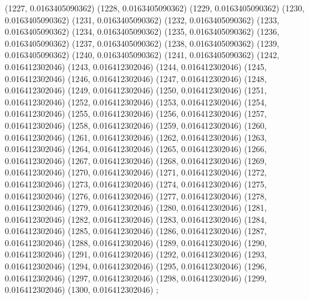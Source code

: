 {					(1227, 0.0163405090362)
					(1228, 0.0163405090362)
					(1229, 0.0163405090362)
					(1230, 0.0163405090362)
					(1231, 0.0163405090362)
					(1232, 0.0163405090362)
					(1233, 0.0163405090362)
					(1234, 0.0163405090362)
					(1235, 0.0163405090362)
					(1236, 0.0163405090362)
					(1237, 0.0163405090362)
					(1238, 0.0163405090362)
					(1239, 0.0163405090362)
					(1240, 0.0163405090362)
					(1241, 0.0163405090362)
					(1242, 0.016412302046)
					(1243, 0.016412302046)
					(1244, 0.016412302046)
					(1245, 0.016412302046)
					(1246, 0.016412302046)
					(1247, 0.016412302046)
					(1248, 0.016412302046)
					(1249, 0.016412302046)
					(1250, 0.016412302046)
					(1251, 0.016412302046)
					(1252, 0.016412302046)
					(1253, 0.016412302046)
					(1254, 0.016412302046)
					(1255, 0.016412302046)
					(1256, 0.016412302046)
					(1257, 0.016412302046)
					(1258, 0.016412302046)
					(1259, 0.016412302046)
					(1260, 0.016412302046)
					(1261, 0.016412302046)
					(1262, 0.016412302046)
					(1263, 0.016412302046)
					(1264, 0.016412302046)
					(1265, 0.016412302046)
					(1266, 0.016412302046)
					(1267, 0.016412302046)
					(1268, 0.016412302046)
					(1269, 0.016412302046)
					(1270, 0.016412302046)
					(1271, 0.016412302046)
					(1272, 0.016412302046)
					(1273, 0.016412302046)
					(1274, 0.016412302046)
					(1275, 0.016412302046)
					(1276, 0.016412302046)
					(1277, 0.016412302046)
					(1278, 0.016412302046)
					(1279, 0.016412302046)
					(1280, 0.016412302046)
					(1281, 0.016412302046)
					(1282, 0.016412302046)
					(1283, 0.016412302046)
					(1284, 0.016412302046)
					(1285, 0.016412302046)
					(1286, 0.016412302046)
					(1287, 0.016412302046)
					(1288, 0.016412302046)
					(1289, 0.016412302046)
					(1290, 0.016412302046)
					(1291, 0.016412302046)
					(1292, 0.016412302046)
					(1293, 0.016412302046)
					(1294, 0.016412302046)
					(1295, 0.016412302046)
					(1296, 0.016412302046)
					(1297, 0.016412302046)
					(1298, 0.016412302046)
					(1299, 0.016412302046)
					(1300, 0.016412302046)
				};
